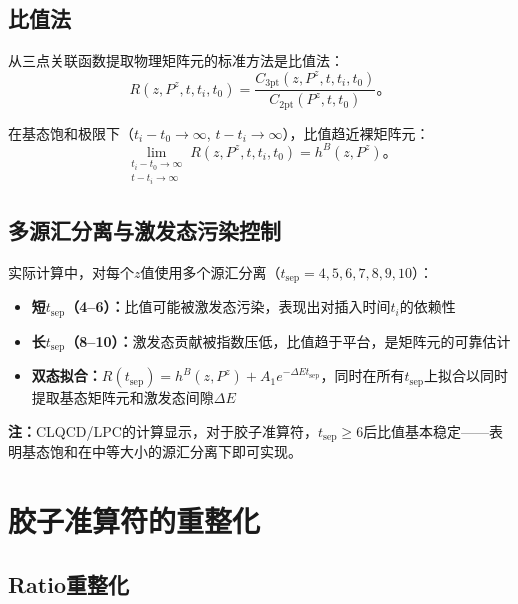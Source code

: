 \documentclass[12pt,a4paper]{ctexart}
\theoremstyle{definition}
\begin{document}
\subsection{比值法}

从三点关联函数提取物理矩阵元的标准方法是比值法\cite{NoteGluonPDFs,Chen2025gluon,本库补充3}：
\begin{equation}
R(z, P^z, t, t_i, t_0) = \frac{C_{3\text{pt}}(z, P^z, t, t_i, t_0)}{C_{2\text{pt}}(P^z, t, t_0)}。
\label{eq:ratio_method}
\end{equation}

在基态饱和极限下（$t_i-t_0\to\infty$, $t-t_i\to\infty$），比值趋近裸矩阵元：
\begin{equation}
\lim_{\substack{t_i-t_0\to\infty \\ t-t_i\to\infty}} R(z, P^z, t, t_i, t_0) = h^B(z, P^z)。
\label{eq:ground_state}
\end{equation}

\subsection{多源汇分离与激发态污染控制}

实际计算中\cite{NoteGluonPDFs,Chen2025gluon}，对每个$z$值使用多个源汇分离（$t_{\text{sep}}=4,5,6,7,8,9,10$）：
\begin{itemize}
    \item \textbf{短$t_{\text{sep}}$（4--6）：}比值可能被激发态污染，表现出对插入时间$t_i$的依赖性
    \item \textbf{长$t_{\text{sep}}$（8--10）：}激发态贡献被指数压低，比值趋于平台，是矩阵元的可靠估计
    \item \textbf{双态拟合：}$R(t_{\text{sep}}) = h^B(z,P^z) + A_1 e^{-\Delta E t_{\text{sep}}}$，同时在所有$t_{\text{sep}}$上拟合以同时提取基态矩阵元和激发态间隙$\Delta E$
\end{itemize}

\textbf{注：}CLQCD/LPC的计算\cite{NoteGluonPDFs}显示，对于胶子准算符，$t_{\text{sep}}\geq 6$后比值基本稳定——表明基态饱和在中等大小的源汇分离下即可实现。

\section{胶子准算符的重整化}

\subsection{Ratio重整化}
\end{document}
